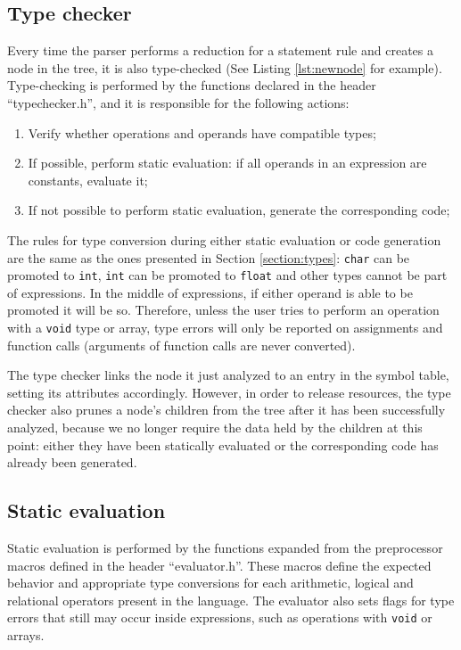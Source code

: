 \subsection{Type checker}
\label{section:tc}

Every time the parser performs a reduction for a statement rule and
creates a node in the tree, it is also type-checked
(See Listing \ref{lst:newnode} for example).
Type-checking is performed by the functions declared
in the header ``typechecker.h'', and it is responsible
for the following actions:

\begin{enumerate}
 \item Verify whether operations and operands have compatible types;
 \item If possible, perform static evaluation: if all operands in an expression are constants, evaluate it;
 \item If not possible to perform static evaluation, generate the corresponding code;
\end{enumerate}

The rules for type conversion during either static evaluation
or code generation are the same as the ones presented in Section
\ref{section:types}:
\texttt{char} can be promoted to \texttt{int},
\texttt{int} can be promoted to \texttt{float} and other types cannot
be part of expressions. In the middle of expressions, if either operand
is able to be promoted it will be so. Therefore, unless the user tries
to perform an operation with a \texttt{void} type or array, type errors
will only be reported on assignments and function calls (arguments of
function calls are never converted).


The type checker links the node it just analyzed to an entry in the symbol table,
setting its attributes accordingly. However, in order to release resources,
the type checker also prunes a node's children from the tree after it has been
successfully analyzed, because we no longer require the data held by the children
at this point: either they have been statically evaluated or the corresponding
code has already been generated.

\subsection{Static evaluation}

Static evaluation is performed by the functions expanded from the
preprocessor macros defined in the header ``evaluator.h''. These
macros define the expected behavior and appropriate type conversions
for each arithmetic, logical and relational operators present in the
language. The evaluator also sets flags for type errors that still
may occur inside expressions, such as operations with \texttt{void} or
arrays.


